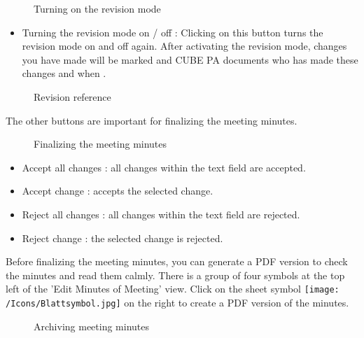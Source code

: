 \begin{figure}[H]
\caption{Turning on the revision mode}
\end{figure}

\begin{itemize}
\item
Turning the revision mode on / off : Clicking on this button turns the revision mode on and off again. After activating the revision mode, changes you have made will be marked  and CUBE PA documents who has made these changes and when .
\end{itemize}

\begin{figure}[H]
\caption{Revision reference}
\end{figure}

The other buttons are important for finalizing the meeting minutes.

\begin{figure}[H]
\caption{Finalizing the meeting minutes}
\end{figure}

\begin{itemize}
\item
Accept all changes : all changes within the text field are accepted.
\item
Accept change : accepts the selected change.
\item
Reject all changes : all changes within the text field are rejected.
\item
Reject change : the selected change is rejected.
\end{itemize}

\vspace{\baselineskip}

Before finalizing the meeting minutes, you can generate a PDF version to check the minutes and read them calmly. There is a group of four symbols at the top left of the 'Edit Minutes of Meeting' view. Click on the sheet symbol \texttt{[image: /Icons/Blattsymbol.jpg]}  on the right to create a PDF version of the minutes.

\begin{figure}[H]
\caption{Archiving meeting minutes}
\end{figure}

